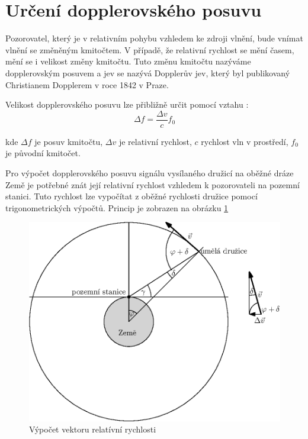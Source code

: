 \section{Určení dopplerovského posuvu}
  Pozorovatel, který je v relativním pohybu vzhledem ke zdroji vlnění, bude vnímat vlnění se změněným kmitočtem. V případě, že relativní rychlost se mění časem, mění se i velikost změny kmitočtu. Tuto změnu kmitočtu nazýváme dopplerovským posuvem a jev se nazývá Dopplerův jev, který byl publikovaný Christianem Dopplerem v roce 1842 v Praze.

  Velikost dopplerovského posuvu lze přibližně určit pomocí vztahu \cite{wiki:doppler_effect}:
  \begin{equation}
    \Delta f = \frac{\Delta v}{c} f_0
  \end{equation}

  kde $\Delta f$ je posuv kmitočtu, $\Delta v$ je relativní rychlost, $c$ rychlost vln v prostředí, $f_0$ je původní kmitočet.

  Pro výpočet dopplerovského posuvu signálu vysílaného družicí na oběžné dráze Země je potřebné znát její relativní rychlost vzhledem k pozorovateli na pozemní stanici. Tuto rychlost lze vypočítat z oběžné rychlosti družice pomocí trigonometrických výpočtů. Princip je zobrazen na obrázku \ref{img:rel_vel}
  \begin{figure}[ht]
    \centering
    \includegraphics{./obrazky/doppler_shift.eps}
    \caption{Výpočet vektoru relatívní rychlosti \cite{book:doppler_compensation}}
    \label{img:rel_vel}
  \end{figure}


%
